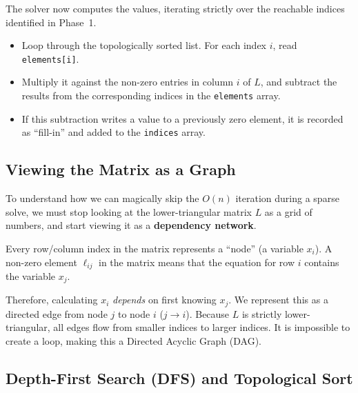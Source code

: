 \documentclass[11pt, a4paper]{article}
\begin{document}
\begin{algostep}
The solver now computes the values, iterating strictly over the reachable indices identified in Phase~1.
\begin{itemize}[itemsep=2pt]
    \item Loop through the topologically sorted list. For each index $i$, read \texttt{elements[i]}.
    \item Multiply it against the non-zero entries in column $i$ of $L$, and subtract the results from the corresponding indices in the \texttt{elements} array.
    \item If this subtraction writes a value to a previously zero element, it is recorded as ``fill-in'' and added to the \texttt{indices} array.
\end{itemize}
\end{algostep}

\subsection{Viewing the Matrix as a Graph}

To understand how we can magically skip the $O(n)$ iteration during a sparse solve, we must stop looking at the lower-triangular matrix $L$ as a grid of numbers, and start viewing it as a \textbf{dependency network}.

\begin{definition}
Every row/column index in the matrix represents a ``node'' (a variable $x_i$). A non-zero element $\ell_{ij}$ in the matrix means that the equation for row $i$ contains the variable $x_j$. 

Therefore, calculating $x_i$ \emph{depends} on first knowing $x_j$. We represent this as a directed edge from node $j$ to node $i$ ($j \to i$). Because $L$ is strictly lower-triangular, all edges flow from smaller indices to larger indices. It is impossible to create a loop, making this a Directed Acyclic Graph (DAG).
\end{definition}

\subsection{Depth-First Search (DFS) and Topological Sort}
\end{document}
